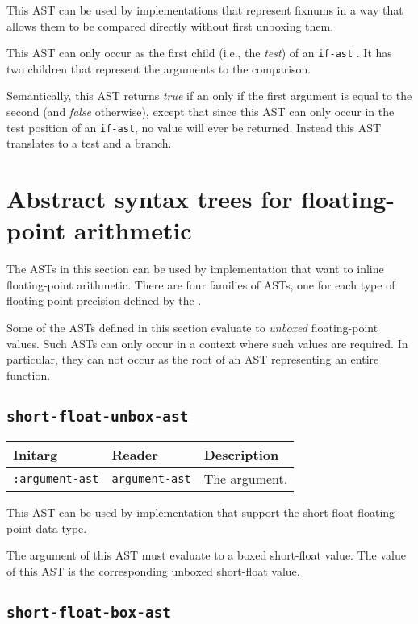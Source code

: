 This AST can be used by implementations that represent fixnums in a
way that allows them to be compared directly without first unboxing
them.

This AST can only occur as the first child (i.e., the \emph{test}) of
an \texttt{if-ast} .  It has two children that
represent the arguments to the comparison.  

Semantically, this AST returns \emph{true} if an only if the first
argument is equal to the second (and \emph{false} otherwise), except
that since this AST can only occur in the test position of an
\texttt{if-ast}, no value will ever be returned.  Instead this AST
translates to a test and a branch.

\section{Abstract syntax trees for floating-point arithmetic}
\label{sec-ast-floating-point-arithmetic}

The ASTs in this section can be used by implementation that want to
inline floating-point arithmetic.  There are four families of ASTs,
one for each type of floating-point precision defined by the \hs{}.

Some of the ASTs defined in this section evaluate to \emph{unboxed}
floating-point values.  Such ASTs can only occur in a context where
such values are required.  In particular, they can not occur as the
root of an AST representing an entire function.  

\subsection{\texttt{short-float-unbox-ast}}
\label{sec-ast-short-float-unbox}

\begin{tabular}{|l|l|l|}
\hline
Initarg & Reader & Description\\
\hline\hline
\texttt{:argument-ast} & \texttt{argument-ast} & The argument.\\
\hline
\end{tabular}

This AST can be used by implementation that support the short-float
floating-point data type.  

The argument of this AST must evaluate to a boxed short-float value.
The value of this AST is the corresponding unboxed short-float value.

\subsection{\texttt{short-float-box-ast}}
\label{sec-ast-short-float-box}

